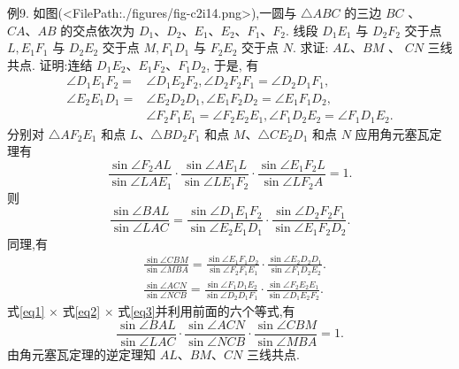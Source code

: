 例9. 如图(<FilePath:./figures/fig-c2i14.png>),一圆与 $\triangle A B C$ 的三边 $B C$ 、 $C A 、 A B$ 的交点依次为 $D_1 、 D_2 、 E_1 、 E_2 、 F_1 、 F_2$. 线段 $D_1 E_1$ 与 $D_2 F_2$ 交于点 $L, E_1 F_1$ 与 $D_2 E_2$ 交于点 $M, F_1 D_1$ 与 $F_2 E_2$ 交于点 $N$. 求证: $A L 、 B M$ 、 $C N$ 三线共点.
证明:连结 $D_1 E_2 、 E_1 F_2 、 F_1 D_2$, 于是, 有
$$
\begin{aligned}
\angle D_1 E_1 F_2= & \angle D_1 E_2 F_2, \angle D_2 F_2 F_1=\angle D_2 D_1 F_1, \\
\angle E_2 E_1 D_1= & \angle E_2 D_2 D_1, \angle E_1 F_2 D_2=\angle E_1 F_1 D_2, \\
& \angle F_2 F_1 E_1=\angle F_2 E_2 E_1, \angle F_1 D_2 E_2=\angle F_1 D_1 E_2 .
\end{aligned}
$$
分别对 $\triangle A F_2 E_1$ 和点 $L 、 \triangle B D_2 F_1$ 和点 $M 、 \triangle C E_2 D_1$ 和点 $N$ 应用角元塞瓦定理有
$$
\frac{\sin \angle F_2 A L}{\sin \angle L A E_1} \cdot \frac{\sin \angle A E_1 L}{\sin \angle L E_1 F_2} \cdot \frac{\sin \angle E_1 F_2 L}{\sin \angle L F_2 A}=1 .
$$
则
$$
\frac{\sin \angle B A L}{\sin \angle L A C}=\frac{\sin \angle D_1 E_1 F_2}{\sin \angle E_2 E_1 D_1} \cdot \frac{\sin \angle D_2 F_2 F_1}{\sin \angle E_1 F_2 D_2} . \label{eq1}
$$
同理,有
$$
\begin{aligned}
& \frac{\sin \angle C B M}{\sin \angle M B A}=\frac{\sin \angle E_1 F_1 D_2}{\sin \angle F_2 F_1 E_1} \cdot \frac{\sin \angle E_2 D_2 D_1}{\sin \angle F_1 D_2 E_2} . \label{eq2} \\
& \frac{\sin \angle A C N}{\sin \angle N C B}=\frac{\sin \angle F_1 D_1 E_2}{\sin \angle D_2 D_1 F_1} \cdot \frac{\sin \angle F_2 E_2 E_1}{\sin \angle D_1 E_2 F_2} . \label{eq3}
\end{aligned}
$$
式\ref{eq1} $\times$ 式\ref{eq2} $\times$ 式\ref{eq3}并利用前面的六个等式,有
$$
\frac{\sin \angle B A L}{\sin \angle L A C} \cdot \frac{\sin \angle A C N}{\sin \angle N C B} \cdot \frac{\sin \angle C B M}{\sin \angle M B A}=1 .
$$
由角元塞瓦定理的逆定理知 $A L 、 B M 、 C N$ 三线共点.



